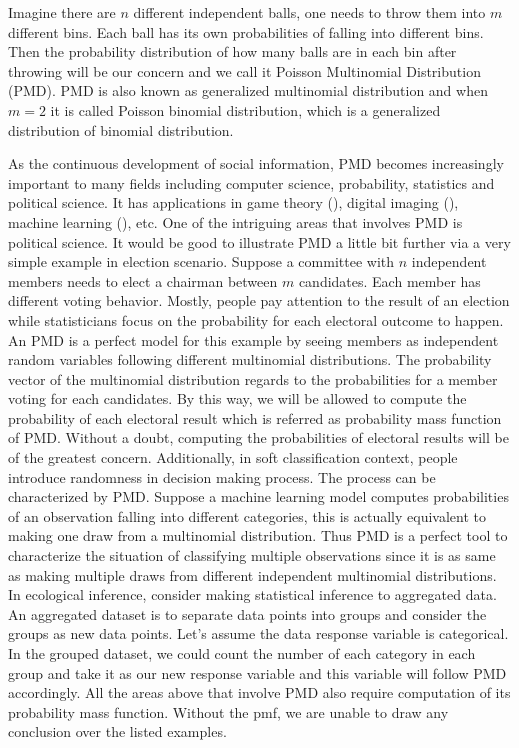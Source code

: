 \documentclass[12pt]{article}
\newcommand{\PMD}{\textrm{PMD}}
\begin{document}
Imagine there are $n$ different independent balls, one needs to throw them into $m$ different bins. Each ball has its own probabilities of falling into different bins. Then the probability distribution of how many balls are in each bin after throwing will be our concern and we call it Poisson Multinomial Distribution (\PMD). $\PMD$ is also known as generalized multinomial distribution and when $m=2$ it is called Poisson binomial distribution, which is a generalized distribution of binomial distribution.

As the continuous development of social information, $\PMD$ becomes increasingly important to many fields including computer science, probability, statistics and political science. It has applications in game theory (), digital imaging (), machine learning (), etc. One of the intriguing areas that involves $\PMD$ is political science. It would be good to illustrate $\PMD$ a little bit further via a very simple example in election scenario. Suppose a committee with $n$  independent members needs to elect a chairman between $m$ candidates. Each member has different voting behavior. Mostly, people pay attention to the result of an election while statisticians focus on the probability for each electoral outcome to happen. An $\PMD$ is a perfect model for this example by seeing members as independent random variables following different multinomial distributions. The probability vector of the multinomial distribution regards to the probabilities for a member voting for each candidates. By this way, we will be allowed to compute the probability of each electoral result which is referred as probability mass function of $\PMD$. Without a doubt, computing the probabilities of electoral results will be of the greatest concern. Additionally, in soft classification context, people introduce randomness in decision making process. The process can be characterized by $\PMD$. Suppose
a machine learning model computes probabilities of an observation falling into different categories, this is actually equivalent to making one draw from a multinomial distribution. Thus $\PMD$ is a perfect tool to characterize the situation of  classifying multiple observations since it is as same as making multiple draws from different independent multinomial distributions. In ecological inference, consider making statistical inference to aggregated data. An aggregated dataset is to separate data points into groups and consider the groups as new data points. Let's assume the data response variable is categorical. In the grouped dataset, we could count the number of each category in each group and take it as our new response variable and this variable will follow $\PMD$ accordingly. All the areas above that involve $\PMD$ also require computation of its probability mass function. Without the pmf, we are unable to draw any conclusion over the listed examples.
\end{document}
